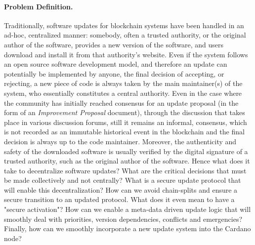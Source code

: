 

\paragraph{Problem Definition.}
Traditionally, software updates for blockchain systems have been handled in an ad-hoc, centralized manner: somebody, often a trusted authority, or the original author of the software, provides a new version of the software, and users
download and install it from that authority's website. Even if the system 
follows an open source software development model, and therefore an update can 
potentially be implemented by anyone, the final decision of accepting, or 
rejecting, a new piece of code is always taken by the main maintainer(s) of the 
system, who essentially constitutes a central authority. Even in the case where 
the community has initially reached consensus for an update proposal (in the 
form of an \emph{Improvement Proposal} document), through the discussion that 
takes place in various discussion forums, still it remains an informal, 
 consensus, which is not recorded as an immutable historical event 
in the blockchain and the final decision is always up to the code maintainer. 
Moreover, the authenticity and safety of the downloaded software is usually 
verified by the digital signature of a trusted authority, such as the original 
author of the software. Hence what does it take to decentralize software 
updates? What are the critical decisions that must be made collectively and not 
centrally? What is a secure update protocol that will enable this 
decentralization? How can we avoid chain-splits and ensure a secure transition 
to an updated protocol. What does it even mean to have a "secure activation"? 
How can we enable a meta-data driven update logic that will smoothly deal with 
priorities, version dependencies, conflicts and emergencies? Finally, how can 
we smoothly incorporate a new update system into the Cardano node?

